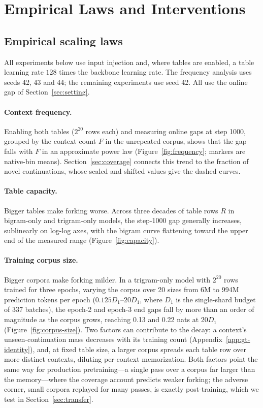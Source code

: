 \section{Empirical Laws and Interventions}
\label{sec:empirical}

\subsection{Empirical scaling laws}
\label{sec:forking-factors}

All experiments below use input injection and, where tables are enabled, a table learning rate $128$ times the backbone learning rate. The frequency analysis uses seeds 42, 43 and 44; the remaining experiments use seed 42. All use the online gap of Section~\ref{sec:setting}.

\paragraph{Context frequency.}
Enabling both tables ($2^{20}$ rows each) and measuring online gaps at step 1000, grouped by the context count $F$ in the unrepeated corpus, shows that the gap falls with $F$ in an approximate power law (Figure~\ref{fig:frequency}; markers are native-bin means). Section~\ref{sec:coverage} connects this trend to the fraction of novel continuations, whose scaled and shifted values give the dashed curves.

\paragraph{Table capacity.}
Bigger tables make forking worse. Across three decades of table rows $R$ in bigram-only and trigram-only models, the step-1000 gap generally increases, sublinearly on log-log axes, with the bigram curve flattening toward the upper end of the measured range (Figure~\ref{fig:capacity}).

\paragraph{Training corpus size.}
Bigger corpora make forking milder. In a trigram-only model with $2^{20}$ rows trained for three epochs, varying the corpus over 20 sizes from 6M to 994M prediction tokens per epoch ($0.125D_1$--$20D_1$, where $D_1$ is the single-shard budget of 337 batches), the epoch-2 and epoch-3 end gaps fall by more than an order of magnitude as the corpus grows, reaching 0.13 and 0.22 nats at $20D_1$ (Figure~\ref{fig:corpus-size}). Two factors can contribute to the decay: a context's unseen-continuation mass decreases with its training count (Appendix~\ref{app:gt-identity}), and, at fixed table size, a larger corpus spreads each table row over more distinct contexts, diluting per-context memorization. Both factors point the same way for production pretraining---a single pass over a corpus far larger than the memory---where the coverage account predicts weaker forking; the adverse corner, small corpora replayed for many passes, is exactly post-training, which we test in Section~\ref{sec:transfer}.

